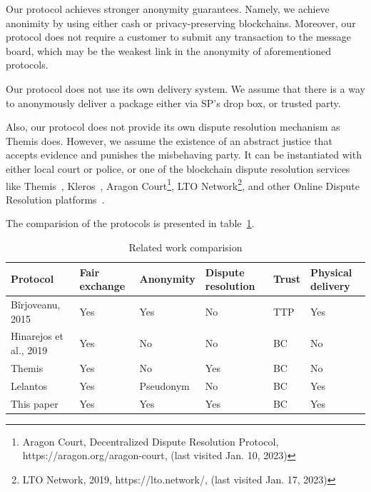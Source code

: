 \documentclass{ieeeaccess}
\begin{document}
Our protocol achieves stronger anonymity guarantees. Namely, we achieve anonimity by using either cash or privacy-preserving blockchains. Moreover, our protocol does not require a customer to submit any transaction to the message board, which may be the weakest link in the anonymity of aforementioned protocols.

Our protocol does not use its own delivery system. We assume that there is a way to anonymously deliver a package either via SP's drop box, or trusted party.

Also, our protocol does not provide its own dispute resolution mechanism as Themis does. However, we assume the existence of an abstract justice that accepts evidence and punishes the misbehaving party. It can be instantiated with either local court or police, or one of the blockchain
dispute resolution services like Themis~\cite{mengThemisDecentralizedEscrow2019}, Kleros~\cite{bergollaKlerosSociolegalCase2022,gudkovCrowdArbitrationBlockchain2020}, Aragon Court\footnote{Aragon Court, Decentralized Dispute Resolution Protocol, https://aragon.org/aragon-court, (last visited Jan. 10, 2023)}, LTO Network\footnote{LTO Network, 2019, https://lto.network/, (last visited Jan. 17, 2023)}, and other Online Dispute Resolution platforms~\cite{allenGovernanceBlockchainDispute2019}.

The comparision of the protocols is presented in table~\ref{tab:comparision}.


\begin{table}
  \newcommand{\YES}{\cellcolor{green!50}Yes}
  \newcommand{\ID}{\cellcolor{green!25}Identity}
  \newcommand{\PSEUDO}{\cellcolor{green!25}Pseudonym}
  \newcommand{\ANON}{\cellcolor{green!50}Anonymity}
  \newcommand{\NO}{\cellcolor{red!50}No}
  \newcommand{\TTP}{\cellcolor{red!50}TTP}
  \newcommand{\BC}{\cellcolor{green!50}BC}
  \caption{Related work comparision}
  \label{tab:comparision}
  \setlength{\tabcolsep}{3pt}
  \begin{tabular}{|p{40pt}|p{35pt}|p{40pt}|p{35pt}|p{30pt}|p{30pt}|}
  \hline
  Protocol & Fair exchange & Anonymity & Dispute resolution & Trust & Physical delivery \\
  \hline
  Bîrjoveanu, 2015~\cite{birjoveanuAnonymityFairexchangeEcommerce2015} & \YES & \YES & \NO & \TTP & \YES \\
  \hline
  Hinarejos et al., 2019~\cite{hinarejosSolutionSecureCertified2019} & \YES & \NO & \NO & \BC & \NO \\
  \hline
  Themis~\cite{mengThemisDecentralizedEscrow2019} & \YES & \NO & \YES & \BC & \NO \\
  \hline
  Lelantos~\cite{altawyLelantosBlockchainBasedAnonymous2017} & \YES & \PSEUDO & \NO & \BC & \YES \\
  \hline
  This paper & \YES & \YES & \YES & \BC & \YES \\
  \hline

  \end{tabular}
\end{table}
 
\end{document}
